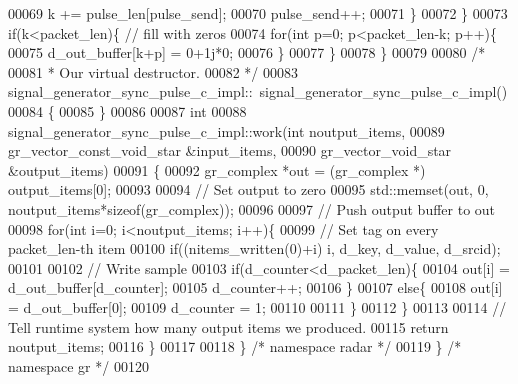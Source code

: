 \begin{DoxyCode}
00069                 k += pulse\_len[pulse\_send];
00070                 pulse\_send++;
00071             \}
00072         \}
00073         \textcolor{keywordflow}{if}(k<packet\_len)\{ \textcolor{comment}{// fill with zeros}
00074             \textcolor{keywordflow}{for}(\textcolor{keywordtype}{int} p=0; p<packet\_len-k; p++)\{
00075                 d_out_buffer[k+p] = 0+1j*0;
00076             \}
00077         \}
00078     \}
00079 
00080     \textcolor{comment}{/*}
00081 \textcolor{comment}{     * Our virtual destructor.}
00082 \textcolor{comment}{     */}
00083     signal_generator_sync_pulse_c_impl::~signal_generator_sync_pulse_c_impl()
00084     \{
00085     \}
00086 
00087     \textcolor{keywordtype}{int}
00088     signal_generator_sync_pulse_c_impl::work(\textcolor{keywordtype}{int} noutput\_items,
00089               gr\_vector\_const\_void\_star &input\_items,
00090               gr\_vector\_void\_star &output\_items)
00091     \{
00092         gr\_complex *out = (gr\_complex *) output\_items[0];
00093         
00094         \textcolor{comment}{// Set output to zero}
00095         std::memset(out, 0, noutput\_items*\textcolor{keyword}{sizeof}(gr\_complex));
00096         
00097         \textcolor{comment}{// Push output buffer to out}
00098         \textcolor{keywordflow}{for}(\textcolor{keywordtype}{int} i=0; i<noutput\_items; i++)\{
00099             \textcolor{comment}{// Set tag on every packet\_len-th item}
00100             \textcolor{keywordflow}{if}((nitems\_written(0)+i)%
      i, d_key, d_value, d_srcid);
00101             
00102             \textcolor{comment}{// Write sample}
00103             \textcolor{keywordflow}{if}(d_counter<d_packet_len)\{
00104                 out[i] = d_out_buffer[d_counter];
00105                 d_counter++;
00106             \}
00107             \textcolor{keywordflow}{else}\{
00108                 out[i] = d_out_buffer[0];
00109                 d_counter = 1;
00110                 
00111             \}
00112         \}
00113 
00114         \textcolor{comment}{// Tell runtime system how many output items we produced.}
00115         \textcolor{keywordflow}{return} noutput\_items;
00116     \}
00117 
00118   \} \textcolor{comment}{/* namespace radar */}
00119 \} \textcolor{comment}{/* namespace gr */}
00120 
\end{DoxyCode}
